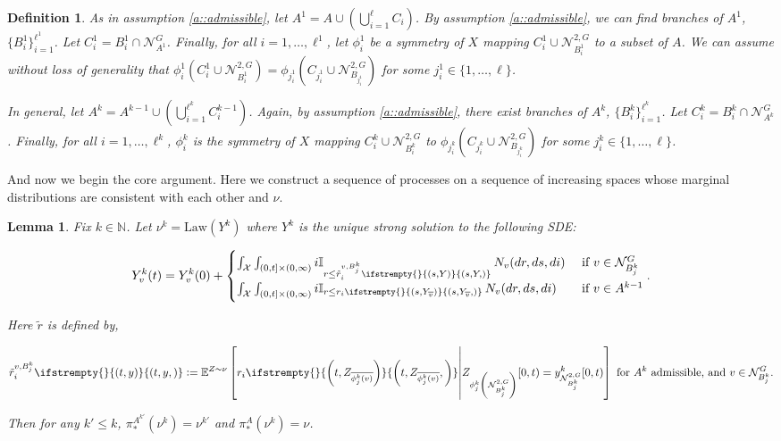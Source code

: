 \documentclass[12pt]{article}
\newcommand{\mb}{\mathbb}
\newcommand{\mc}{\mathcal}
\newcommand{\ov}{\overline}
\newcommand{\te}{\text}
\newcommand{\ind}{\hspace{24pt}}
\newcommand{\exmu}[2]{\mb{E}^{#1}\left[#2\right]}	%
\newcommand{\defeq}{:=}								%
\newcommand{\sta}{\mc{X}}							%
\newcommand{\gneigh}[2]{\mc{N}^{#1}_{#2}}			%
\newcommand{\dgneigh}[2]{\mc{N}^{2,#1}_{#2}}		%
\newcommand{\cl}[1]{\ov{#1}}						%
\newcommand{\indx}[1]{^{#1}}						%
\newcommand{\Xf}{X}									%
\newcommand{\poiss}{N}								%
\newcommand{\Sm}{\ell}								%
\newcommand{\rate}{r}								%
\newcommand{\proj}{\pi}								%
\newcommand{\xg}{y}									%
\newcommand{\poissv}[1]{_{#1}}						%
\newcommand{\vind}[1]{_{#1}}						%
\newcommand{\tme}[1]{(#1)}							%
\newcommand{\tmi}[1]{#1}							%
\newcommand{\vpara}[1]{^{#1}}						%
\newcommand{\stpara}[1]{_{#1}}						%
\newcommand{\psf}{_*}								%
\newcommand{\tmepro}[3]{
\ifstrempty{#3}{
	\left(#1,#2\right)}{
	\left(#1,#2,#3\right)}}							%
\newcommand{\Xg}{Y}									%
\newcommand{\brate}{\alt{\rate}}					%
\newcommand{\alt}[1]{\tilde{#1}}					%
\newcommand{\mm}{\nu}								%
\newcommand{\law}{\te{Law}}							%
\newcommand{\Xh}{Z}									%
\newcommand{\vjpara}[2]{^{#1,#2}}					%
\newtheorem{lem}[thms]{Lemma}
\newtheorem{defn}[thms]{Definition}
\begin{document}
\begin{defn}
As in assumption \ref{a::admissible}, let \(A\indx{1} = A\cup\left(\bigcup_{i=1}^\Sm C_i\right)\). By assumption \ref{a::admissible}, we can find branches of \(A\indx{1}\), \(\{B_i\indx{1}\}_{i=1}^{\Sm\indx{1}}\). Let \(C_i\indx{1} = B_i\indx{1}\cap\gneigh{G}{A\indx{1}}\). Finally, for all \(i = 1,\dots,\Sm\indx{1}\), let \(\phi_i\indx{1}\) be a symmetry of \(\Xf\) mapping \(C_i\indx{1}\cup \dgneigh{G}{B\indx{1}_i}\) to a subset of \(A\). We can assume without loss of generality that \(\phi_i\indx{1}(C_i\indx{1}\cup \dgneigh{G}{B\indx{1}_i}) = \phi_{j\indx{1}_i}(C_{j\indx{1}_i}\cup\dgneigh{G}{B_{j\indx{1}_i}})\) for some \(j\indx{1}_i \in \{1,\dots,\Sm\}\).

\ind In general, let \(A\indx{k} = A\indx{k-1} \cup \left(\bigcup_{i=1}^{\Sm\indx{k}} C_i\indx{k-1}\right)\). Again, by assumption \ref{a::admissible}, there exist branches of \(A\indx{k}\), \(\{B_i\indx{k}\}_{i=1}^{\Sm\indx{k}}\). Let \(C_i\indx{k} = B_i\indx{k}\cap \gneigh{G}{A\indx{k}}\). Finally, for all \(i=1,\dots,\Sm\indx{k}\), \(\phi_i\indx{k}\) is the symmetry of \(\Xf\) mapping \(C_i\indx{k}\cup\dgneigh{G}{B_i\indx{k}}\) to \(\phi_{j\indx{k}_i}(C_{j\indx{k}_i}\cup\dgneigh{G}{B_{j\indx{k}_i}})\) for some \(j\indx{k}_i \in \{1,\dots,\Sm\}\).
\label{Uq::Extnot}
\end{defn}

And now we begin the core argument. Here we construct a sequence of processes on a sequence of increasing spaces whose marginal distributions are consistent with each other and \(\mm\).

\begin{lem}
Fix \(k \in \mb{N}\). Let \(\mm\indx{k} = \law(\Xg\indx{k})\) where \(\Xg\indx{k}\) is the unique strong solution to the following SDE:

\begin{equation}
\Xg\indx{k}\vind{v}\tme{t} = \Xg\indx{k}\vind{v}\tme{0} + 
\begin{cases}
\int_\sta\int_{(0,t]\times(0,\infty)} i\mb{I}_{r \leq \brate\vjpara{v}{B\indx{k}_j}\stpara{i}\tmepro{s}{\Xg}{}}\,\poiss\poissv{v}(dr,ds,di) &\te{ if } v \in \gneigh{G}{B\indx{k}_j}\\
\int_\sta\int_{(0,t]\times(0,\infty)} i\mb{I}_{r \leq \rate\stpara{i}\tmepro{s}{\Xg\vind{\cl{v}}}{}}\,\poiss\poissv{v}(dr,ds,di) &\te{ if } v \in A\indx{k-1}
\end{cases}.
\label{Uq::exteqn}
\end{equation}

Here \(\brate\) is defined by,

\[\brate\vjpara{v}{B\indx{k}_j}\stpara{i}\tmepro{t}{\xg}{} \defeq \exmu{\Xh\sim \mm}{\rate\stpara{i}\tmepro{t}{\Xh\vind{\cl{\phi_j\indx{k}(v)}}}{}\middle|\Xh\vind{\phi_j\indx{k}\left(\dgneigh{G}{B\indx{k}_j}\right)}\tmi{[0,t)} = \xg\indx{k}\vind{\dgneigh{G}{B\indx{k}_j}}\tmi{[0,t)}} \te{ for } A\indx{k}\te{ admissible, and } v \in \gneigh{G}{B\indx{k}_j}.\]

Then for any \(k' \leq k\), \(\proj\psf\vpara{A\indx{k'}}(\mm\indx{k}) = \mm\indx{k'}\) and \(\proj\psf\vpara{A}(\mm\indx{k}) = \mm\).
\label{Uq::ext}
\end{lem}
\end{document}
